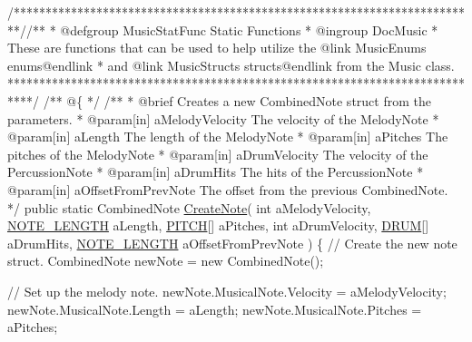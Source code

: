 \begin{DoxyCodeInclude}
    \textcolor{comment}{/*************************************************************************/}\textcolor{comment}{/** }
\textcolor{comment}{     * @defgroup MusicStatFunc Static Functions}
\textcolor{comment}{     * @ingroup DocMusic}
\textcolor{comment}{     * These are functions that can be used to help utilize the @link MusicEnums enums@endlink}
\textcolor{comment}{     * and @link MusicStructs structs@endlink from the Music class.}
\textcolor{comment}{     ****************************************************************************/}\textcolor{comment}{}
\textcolor{comment}{    /** @\{ */}
\textcolor{comment}{}
\textcolor{comment}{    /**}
\textcolor{comment}{     * @brief Creates a new CombinedNote struct from the parameters.}
\textcolor{comment}{     * @param[in] aMelodyVelocity The velocity of the MelodyNote}
\textcolor{comment}{     * @param[in] aLength The length of the MelodyNote}
\textcolor{comment}{     * @param[in] aPitches The pitches of the MelodyNote}
\textcolor{comment}{     * @param[in] aDrumVelocity The velocity of the PercussionNote}
\textcolor{comment}{     * @param[in] aDrumHits The hits of the PercussionNote}
\textcolor{comment}{     * @param[in] aOffsetFromPrevNote The offset from the previous CombinedNote.}
\textcolor{comment}{    */}
    \textcolor{keyword}{public} \textcolor{keyword}{static} CombinedNote \hyperlink{group___music_stat_func_gaaf74885e43eb623f64f961985fadcd08}{CreateNote}( \textcolor{keywordtype}{int} aMelodyVelocity, 
      \hyperlink{group___music_enums_gaf11b5f079adbb21c800b9eca1c5c3cbd}{NOTE\_LENGTH} aLength, \hyperlink{group___music_enums_ga508f69b199ea518f935486c990edac1d}{PITCH}[] aPitches, \textcolor{keywordtype}{int} aDrumVelocity, \hyperlink{group___music_enums_gade475b4382c7066d1af13e7c13c029b6}{DRUM}[] aDrumHits, 
      \hyperlink{group___music_enums_gaf11b5f079adbb21c800b9eca1c5c3cbd}{NOTE\_LENGTH} aOffsetFromPrevNote )
    \{
        \textcolor{comment}{// Create the new note struct.}
        CombinedNote newNote = \textcolor{keyword}{new} CombinedNote();

        \textcolor{comment}{// Set up the melody note.}
        newNote.MusicalNote.Velocity = aMelodyVelocity;
        newNote.MusicalNote.Length = aLength;
        newNote.MusicalNote.Pitches = aPitches;


\end{DoxyCodeInclude}
